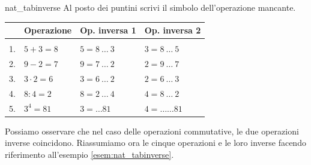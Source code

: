 
\begin{esempio}{}{nat_tabinverse}
Al posto dei puntini scrivi il simbolo dell'operazione mancante.

\begin{center}
\begin{tabular}{rlll}
 & Operazione & Op. inversa 1 & Op. inversa 2\\ \hline \\ [-.5em]
1. & \(5 + 3 = 8\) & \(5 = 8 ~\dots~ 3\) & \(3 = 8 ~\dots~ 5\)\\ 
2. & \(9 - 2 = 7\) & \(9 = 7 ~\dots~ 2\) & \(2 = 9 ~\dots~ 7\)\\
3. & \(3 \cdot 2 = 6\) & \(3 = 6 ~\dots~ 2\) & \(2 = 6 ~\dots~ 3\)\\
4. & \(8 : 4 = 2\) & \(8 = 2 ~\dots~ 4\) & \(4 = 8 ~\dots~ 2\)\\
5. & \(3 ^4 = 81\) & \(3 = \dots 81\) & \(4 = \dots\! \dots 81\)\\
\hline
\end{tabular}
\end{center}
\end{esempio}
Possiamo osservare che nel caso delle operazioni commutative, le due 
operazioni inverse coincidono.
Riassumiamo ora le cinque operazioni e le loro inverse facendo riferimento 
all'esempio \ref{esem:nat_tabinverse}. %
